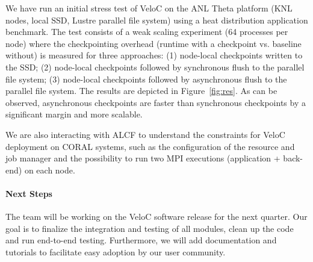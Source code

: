 We have run an initial stress test of VeloC on the ANL Theta platform
(KNL nodes, local SSD, Lustre parallel file system) using a heat
distribution application benchmark. The test consists of a weak
scaling experiment (64 processes per node) where the checkpointing
overhead (runtime with a checkpoint vs. baseline without) is measured
for three approaches: (1) node-local checkpoints written to the SSD;
(2) node-local checkpoints followed by synchronous flush to the
parallel file system; (3) node-local checkpoints followed by
asynchronous flush to the parallel file system.  The results are
depicted in Figure~\ref{fig:res}. As can be observed, asynchronous
checkpoints are faster than synchronous checkpoints by a significant
margin and more scalable.

We are also interacting with ALCF to understand the constraints for
VeloC deployment on CORAL systems, such as the configuration of the
resource and job manager and the possibility to run two MPI executions
(application + back-end) on each node.

\paragraph{Next Steps}


The team will be working on the VeloC software release for the next quarter.
Our goal is to finalize the integration and testing of all modules, clean up
the code and run end-to-end testing. Furthermore, we will add documentation
and tutorials to facilitate easy adoption by our user community.
